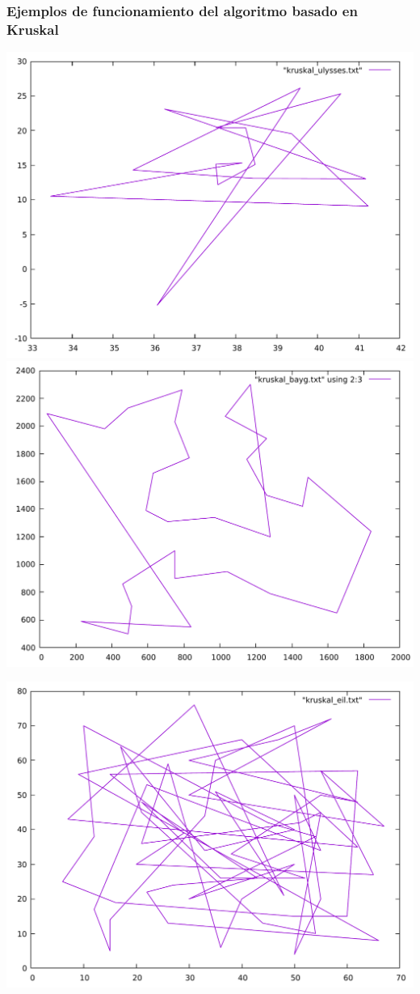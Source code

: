 \documentclass[13pt]{beamer}
\begin{document}
	\begin{frame}
		\frametitle{Ejemplos de funcionamiento del algoritmo basado en Kruskal}
			\includegraphics[scale=0.2]{../src/kruskal_ulysses.pdf}
			\includegraphics[scale=0.2]{../src/kruskal_bayg.pdf}
			\begin{center}
				\includegraphics[scale=0.2]{../src/kruskal_eil.pdf}
			\end{center}
	\end{frame}
\end{document}

